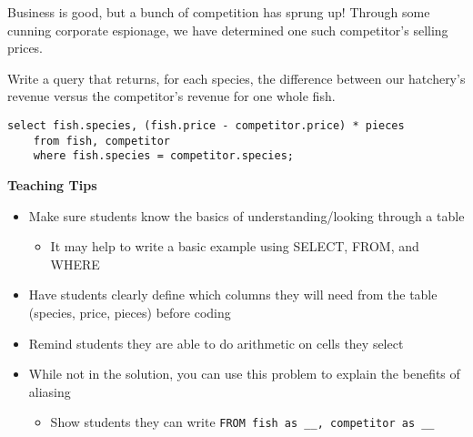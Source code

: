 \begin{blocksection}
\question Business is good, but a bunch of competition has sprung up! Through some cunning corporate espionage, we have determined one such competitor's selling prices.

Write a query that returns, for each species, the difference between our hatchery's revenue versus the competitor's revenue for one whole fish.


\begin{solution}[1.5in]
\begin{lstlisting}
select fish.species, (fish.price - competitor.price) * pieces
    from fish, competitor
    where fish.species = competitor.species;
\end{lstlisting}
\end{solution}
\end{blocksection}

\begin{blocksection}
\begin{guide}
\textbf{Teaching Tips}
\begin{itemize}
  \item Make sure students know the basics of understanding/looking through a table
  \begin{itemize}
    \item It may help to write a basic example using SELECT, FROM, and WHERE
  \end{itemize}
  \item Have students clearly define which columns they will need from the table (species, price, pieces) before coding
  \item Remind students they are able to do arithmetic on cells they select
  \item While not in the solution, you can use this problem to explain the benefits of aliasing
  \begin{itemize}
    \item Show students they can write \lstinline{FROM fish as __, competitor as __}
  \end{itemize}
\end{itemize}
\end{guide}
\end{blocksection}
